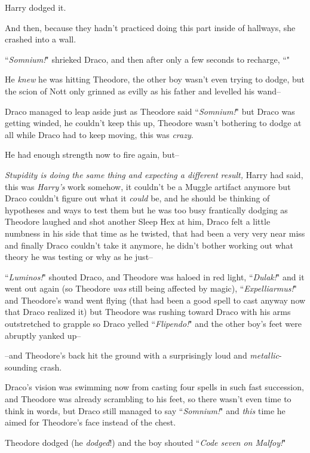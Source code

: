 Harry dodged it.

And then, because they hadn't practiced doing this part inside of hallways, she crashed into a wall.

\later

``\emph{Somnium!}" shrieked Draco, and then after only a few seconds to recharge, ``"

He \emph{knew} he was hitting Theodore, the other boy wasn't even trying to dodge, but the scion of Nott only grinned as evilly as his father and levelled his wand\---

Draco managed to leap aside just as Theodore said ``\emph{Somnium!}" but Draco was getting winded, he couldn't keep this up, Theodore wasn't bothering to dodge at all while Draco had to keep moving, this was \emph{crazy}.

He had enough strength now to fire again, but\---

\emph{Stupidity is doing the same thing and expecting a different result,} Harry had said, this was \emph{Harry's} work somehow, it couldn't be a Muggle artifact anymore but Draco couldn't figure out what it \emph{could} be, and he should be thinking of hypotheses and ways to test them but he was too busy frantically dodging as Theodore laughed and shot another Sleep Hex at him, Draco felt a little numbness in his side that time as he twisted, that had been a very very near miss and finally Draco couldn't take it anymore, he didn't bother working out what theory he was testing or why as he just\---

``\emph{Luminos!}" shouted Draco, and Theodore was haloed in red light, ``\emph{Dulak!}" and it went out again (so Theodore \emph{was} still being affected by magic), ``\emph{Expelliarmus!}" and Theodore's wand went flying (that had been a good spell to cast anyway now that Draco realized it) but Theodore was rushing toward Draco with his arms outstretched to grapple so Draco yelled ``\emph{Flipendo!}" and the other boy's feet were abruptly yanked up\---

\---and Theodore's back hit the ground with a surprisingly loud and \emph{metallic}-sounding crash.

Draco's vision was swimming now from casting four spells in such fast succession, and Theodore was already scrambling to his feet, so there wasn't even time to think in words, but Draco still managed to say ``\emph{Somnium!}" and \emph{this} time he aimed for Theodore's face instead of the chest.

Theodore dodged (he \emph{dodged}!) and the boy shouted ``\emph{Code seven on Malfoy!}"

